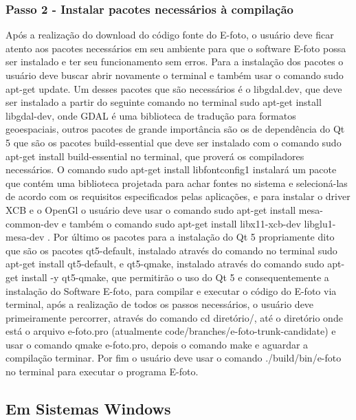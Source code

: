     
  \subsubsection{Passo 2 - Instalar pacotes necessários à compilação}  %
    Após a realização do download do código fonte do E-foto, o usuário deve ficar atento aos pacotes necessários em seu ambiente para que o software E-foto possa ser instalado e ter seu funcionamento sem erros. Para a instalação dos pacotes o usuário deve buscar abrir novamente o terminal e também usar o comando sudo apt-get update. Um desses pacotes que são necessários é o libgdal.dev, que deve ser instalado a partir do seguinte comando no terminal sudo apt-get install libgdal-dev, onde GDAL é uma biblioteca de tradução para formatos geoespaciais, outros pacotes de grande importância são os de dependência do Qt 5 que são os pacotes build-essential que deve ser instalado com o comando sudo apt-get install build-essential no terminal, que proverá os compiladores necessários. O comando sudo apt-get install libfontconfig1 instalará um pacote que contém uma biblioteca projetada para achar fontes no sistema e selecioná-las de acordo com os requisitos especificados pelas aplicações, e para instalar o driver XCB e o OpenGl o usuário deve usar o comando sudo apt-get install mesa-common-dev e também o comando sudo apt-get install libx11-xcb-dev libglu1-mesa-dev . Por último os pacotes para a instalação do Qt 5 propriamente dito que são os pacotes qt5-default, instalado através do comando no terminal sudo apt-get install qt5-default, e qt5-qmake, instalado através do comando sudo apt-get install -y qt5-qmake, que permitirão o uso do Qt 5 e consequentemente a instalação do Software E-foto, para compilar e executar o código do E-foto via terminal, após a realização de todos os passos necessários, o usuário deve primeiramente percorrer, através do comando cd diretório/, até o diretório onde está o arquivo e-foto.pro (atualmente code/branches/e-foto-trunk-candidate) e usar o comando qmake e-foto.pro, depois o comando make e aguardar a compilação terminar. Por fim o usuário deve usar o comando ./build/bin/e-foto no terminal para executar o programa E-foto.

\subsection{Em Sistemas Windows}

